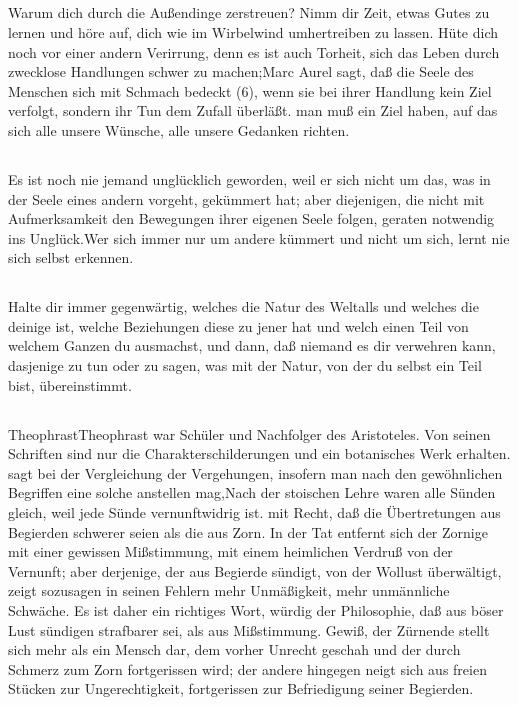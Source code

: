 \documentclass[12pt,ngerman,parskip=full]{scrartcl}
\newcounter{abschnitt}
\newcommand{\abschnitt}{\subsection*{\theabschnitt}\stepcounter{abschnitt}}
\begin{document}
\abschnitt

Warum dich durch die Außendinge zerstreuen? Nimm dir Zeit, etwas Gutes zu lernen und höre auf, dich wie im Wirbelwind umhertreiben zu lassen. Hüte dich noch vor einer andern Verirrung, denn es ist auch Torheit, sich das Leben durch zwecklose Handlungen schwer zu machen;Marc Aurel sagt, daß die Seele des Menschen sich mit Schmach bedeckt (6), wenn sie bei ihrer Handlung kein Ziel verfolgt, sondern ihr Tun dem Zufall überläßt. man muß ein Ziel haben, auf das sich alle unsere Wünsche, alle unsere Gedanken richten.

\abschnitt

Es ist noch nie jemand unglücklich geworden, weil er sich nicht um das, was in der Seele eines andern vorgeht, gekümmert hat; aber diejenigen, die nicht mit Aufmerksamkeit den Bewegungen ihrer eigenen Seele folgen, geraten notwendig ins Unglück.Wer sich immer nur um andere kümmert und nicht um sich, lernt nie sich selbst erkennen.

\abschnitt

Halte dir immer gegenwärtig, welches die Natur des Weltalls und welches die deinige ist, welche Beziehungen diese zu jener hat und welch einen Teil von welchem Ganzen du ausmachst, und dann, daß niemand es dir verwehren kann, dasjenige zu tun oder zu sagen, was mit der Natur, von der du selbst ein Teil bist, übereinstimmt.

\abschnitt

TheophrastTheophrast war Schüler und Nachfolger des Aristoteles. Von seinen Schriften sind nur die Charakterschilderungen und ein botanisches Werk erhalten. sagt bei der Vergleichung der Vergehungen, insofern man nach den gewöhnlichen Begriffen eine solche anstellen mag,Nach der stoischen Lehre waren alle Sünden gleich, weil jede Sünde vernunftwidrig ist. mit Recht, daß die Übertretungen aus Begierden schwerer seien als die aus Zorn. In der Tat entfernt sich der Zornige mit einer gewissen Mißstimmung, mit einem heimlichen Verdruß von der Vernunft; aber derjenige, der aus Begierde sündigt, von der Wollust überwältigt, zeigt sozusagen in seinen Fehlern mehr Unmäßigkeit, mehr unmännliche Schwäche. Es ist daher ein richtiges Wort, würdig der Philosophie, daß aus böser Lust sündigen strafbarer sei, als aus Mißstimmung. Gewiß, der Zürnende stellt sich mehr als ein Mensch dar, dem vorher Unrecht geschah und der durch Schmerz zum Zorn fortgerissen wird; der andere hingegen neigt sich aus freien Stücken zur Ungerechtigkeit, fortgerissen zur Befriedigung seiner Begierden.
\end{document}
